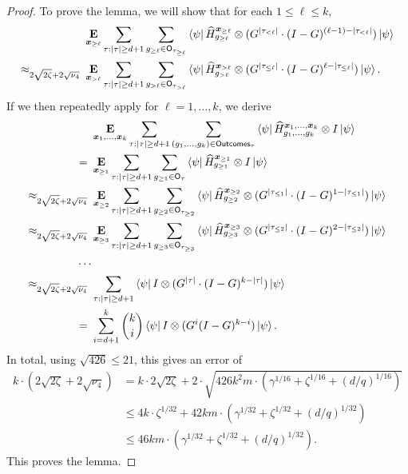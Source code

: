 \begin{proof}
To prove the lemma, we will show that for each $1 \leq \ell \leq k$,
\begin{align}
&\mathop{\bf E\/}_{{\boldsymbol{x}}_{\geq \ell}} \sum_{\tau:|\tau| \geq d+1}  \sum_{g_{\geq \ell} \in \mathsf{O}_{\tau_{\geq \ell}}}
	\bra{\psi} \widehat{H}^{{\boldsymbol{x}}_{\geq \ell}}_{g_{\geq \ell}} \otimes (G^{|\tau_{<\ell}|}\cdot (I-G)^{(\ell-1)-|\tau_{<\ell}|}) \ket{\psi}\nonumber\\
\approx_{2\sqrt{2\zeta} + 2 \sqrt{\nu_4}}~&\mathop{\bf E\/}_{{\boldsymbol{x}}_{>\ell}} \sum_{\tau:|\tau| \geq d+1} \sum_{g_{> \ell} \in \mathsf{O}_{\tau_{> \ell}}}
	\bra{\psi} \widehat{H}^{{\boldsymbol{x}}_{> \ell}}_{g_{> \ell}} \otimes (G^{|\tau_{\leq \ell}|} \cdot (I-G)^{\ell-|\tau_{\leq\ell}|}) \ket{\psi}.
	\label{eq:i-think-this-is-what-i'm-supposed-to-prove}
\end{align}
If we then repeatedly apply  for $\ell = 1, \ldots, k$,
we derive
\begin{align*}
&\mathop{\bf E\/}_{{\boldsymbol{x}}_1, \dots, {\boldsymbol{x}}_k} \sum_{\tau:|\tau| \geq d+1} 
	\sum_{(g_1, \ldots, g_{k}) \in \mathsf{Outcomes}_{\tau}} \bra{\psi} \widehat{H}^{{\boldsymbol{x}}_1, \dots, {\boldsymbol{x}}_k}_{g_1, \dots, g_k} \otimes I \ket{\psi}\\
=~&\mathop{\bf E\/}_{{\boldsymbol{x}}_{\geq 1}} \sum_{\tau:|\tau| \geq d+1} 
	\sum_{g_{\geq 1} \in \mathsf{O}_{\tau}} \bra{\psi} \widehat{H}^{{\boldsymbol{x}}_{\geq 1}}_{g_{\geq 1}} \otimes I \ket{\psi}\\
\approx_{2\sqrt{2\zeta} + 2 \sqrt{\nu_4}}~&\mathop{\bf E\/}_{{\boldsymbol{x}}_{\geq 2}} \sum_{\tau:|\tau| \geq d+1} 
	\sum_{g_{\geq 2} \in \mathsf{O}_{\tau_{\geq 2}}} \bra{\psi} \widehat{H}^{{\boldsymbol{x}}_{\geq 2}}_{g_{\geq 2}} \otimes (G^{|\tau_{\leq 1}|} \cdot (I-G)^{1-|\tau_{\leq1}|}) \ket{\psi}\\
\approx_{2\sqrt{2\zeta} + 2 \sqrt{\nu_4}}~&\mathop{\bf E\/}_{{\boldsymbol{x}}_{\geq 3}} \sum_{\tau:|\tau| \geq d+1} 
	\sum_{g_{\geq 3} \in \mathsf{O}_{\tau_{\geq 3}}} \bra{\psi} \widehat{H}^{{\boldsymbol{x}}_{\geq 3}}_{g_{\geq 3}} \otimes (G^{|\tau_{\leq 2}|} \cdot (I-G)^{2-|\tau_{\leq2}|}) \ket{\psi}\\
	\cdots&\\
\approx_{2\sqrt{2\zeta} + 2 \sqrt{\nu_4}}~& \sum_{\tau:|\tau| \geq d+1} 
	 \bra{\psi}I  \otimes (G^{|\tau|} \cdot (I-G)^{k-|\tau|}) \ket{\psi}\\
=~&\sum_{i = d+1}^k \binom{k}{i} \bra{\psi} I \otimes ( G^i (I-G)^{k-i} ) \ket{\psi}.
\end{align*}
In total, using $\sqrt{426}\leq 21$, this gives an error of
\begin{align*}
k \cdot(2\sqrt{2\zeta} + 2 \sqrt{\nu_4})
& = k \cdot 2 \sqrt{2 \zeta} + 2 \cdot \sqrt{426 k^2 m \cdot \left( \gamma^{1/16} +\zeta^{1/16} + (d/q)^{1/16}\right)}\\
& \leq 4k \cdot \zeta^{1/32} + 42 k m \cdot \left(\gamma^{1/32} + \zeta^{1/32} + (d/q)^{1/32}\right)\\
& \leq 46 k m \cdot \left(\gamma^{1/32} +\zeta^{1/32} +  (d/q)^{1/32}\right).
\end{align*}
This proves the lemma.


\end{proof}
